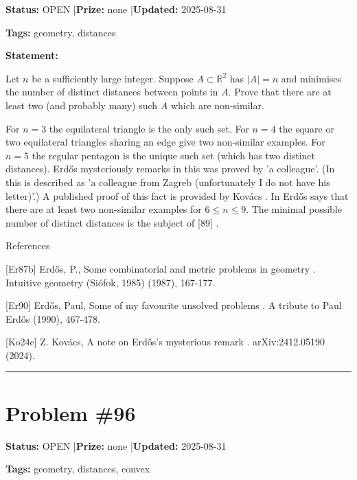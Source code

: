 \documentclass{article}
\begin{document}
\noindent\textbf{Status:} OPEN \quad|\quad \textbf{Prize:} none \quad|\quad \textbf{Updated:} 2025-08-31

\noindent\textbf{Tags:} geometry, distances

\medskip

\noindent\textbf{Statement:}

Let $n$ be a sufficiently large integer. Suppose $A\subset \mathbb{R}^2$ has $\lvert A\rvert=n$ and minimises the number of distinct distances between points in $A$. Prove that there are at least two (and probably many) such $A$ which are non-similar.




For $n=3$ the equilateral triangle is the only such set. For $n=4$ the square or two equilateral triangles sharing an edge give two non-similar examples. For $n=5$ the regular pentagon is the unique such set (which has two distinct distances). Erd\H{o}s mysteriously remarks in \cite{Er90} this was proved by 'a colleague'. (In \cite{Er87b} this is described as 'a colleague from Zagreb (unfortunately I do not have his letter)'.) A published proof of this fact is provided by Kov\'{a}cs \cite{Ko24c}. In \cite{Er87b} Erd\H{o}s says that there are at least two non-similar examples for $6\leq n\leq 9$. The minimal possible number of distinct distances is the subject of [89] .




References

[Er87b] Erd\H{o}s, P., Some combinatorial and metric problems in geometry . Intuitive geometry (Si\'{o}fok, 1985) (1987), 167-177.

[Er90] Erd\H{o}s, Paul, Some of my favourite unsolved problems . A tribute to Paul Erd\H{o}s (1990), 467-478.

[Ko24c] Z. Kov\'{a}cs, A note on Erd\H{o}s's mysterious remark . arXiv:2412.05190 (2024).

\noindent\rule{\linewidth}{0.4pt}


\section{Problem \#96}
\label{prob:96}

\noindent\textbf{Status:} OPEN \quad|\quad \textbf{Prize:} none \quad|\quad \textbf{Updated:} 2025-08-31

\noindent\textbf{Tags:} geometry, distances, convex

\medskip
\end{document}
